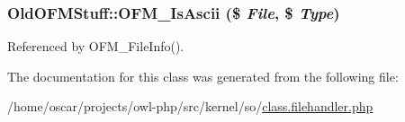 \subsubsection[{OFM\_\-IsAscii}]{\setlength{\rightskip}{0pt plus 5cm}OldOFMStuff::OFM\_\-IsAscii (\$ {\em File}, \/  \$ {\em Type})}\label{classOldOFMStuff_a5ba4191cf6b199f40bc9209a6e67a119}


Referenced by OFM\_\-FileInfo().



The documentation for this class was generated from the following file:\begin{DoxyCompactItemize}
\item 
/home/oscar/projects/owl-\/php/src/kernel/so/\hyperlink{class_8filehandler_8php}{class.filehandler.php}\end{DoxyCompactItemize}
